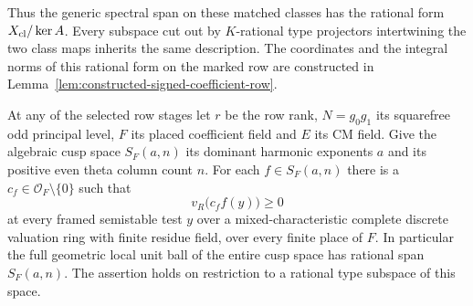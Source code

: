 Thus the generic spectral span on these matched classes has the
rational form \(X_{\rm cl}/\ker A\). Every subspace cut out by
\(K\)-rational type projectors intertwining the two class maps
inherits the same description. The coordinates and the integral norms of this rational form on
the marked row are constructed in Lemma~\ref{lem:constructed-signed-coefficient-row}.

\begin{auxlemma}
\label{lem:placed-row-full-cusp-ball}
At any of the selected row stages let \(r\) be the row rank,
\(N=g_0g_1\) its squarefree odd principal level, \(F\) its placed
coefficient field and \(E\) its CM field. Give the algebraic cusp
space \(S_F(a,n)\) its dominant harmonic exponents \(a\) and its
positive even theta column count \(n\). For each \(f\in S_F(a,n)\)
there is a \(c_f\in\mathcal O_F\setminus\{0\}\) such that
\[
      v_R\bigl(c_ff(y)\bigr)\ge0
\]
at every framed semistable test \(y\) over a mixed-characteristic
complete discrete valuation ring with finite residue field, over
every finite place of \(F\). In particular the full geometric
local unit ball of the entire cusp space has rational span
\(S_F(a,n)\). The assertion holds on restriction to a rational
type subspace of this space.
\end{auxlemma}
